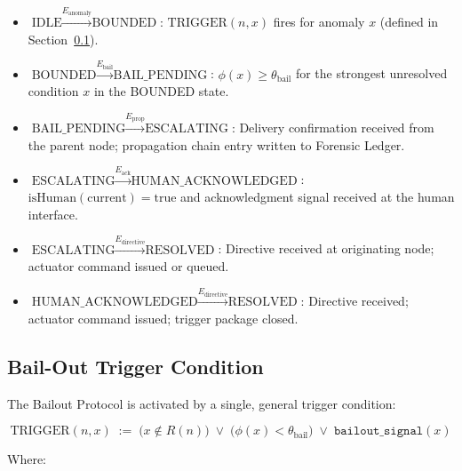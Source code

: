 \begin{itemize}\itemsep=0pt
\item $\text{IDLE} \xrightarrow{E_{\text{anomaly}}} \text{BOUNDED}$:
  $\text{TRIGGER}(n, x)$ fires for anomaly $x$ (defined in
  Section~\ref{sec:bailout-trigger}).

\item $\text{BOUNDED} \xrightarrow{E_{\text{bail}}} \text{BAIL\_PENDING}$:
  $\phi(x) \geq \theta_{\text{bail}}$ for the strongest unresolved condition
  $x$ in the BOUNDED state.

\item $\text{BAIL\_PENDING} \xrightarrow{E_{\text{prop}}} \text{ESCALATING}$:
  Delivery confirmation received from the parent node; propagation chain entry
  written to Forensic Ledger.

\item $\text{ESCALATING} \xrightarrow{E_{\text{ack}}} \text{HUMAN\_ACKNOWLEDGED}$:
  $\text{isHuman}(\text{current}) = \text{true}$ and acknowledgment signal
  received at the human interface.

\item $\text{ESCALATING} \xrightarrow{E_{\text{directive}}} \text{RESOLVED}$:
  Directive received at originating node; actuator command issued or queued.

\item $\text{HUMAN\_ACKNOWLEDGED} \xrightarrow{E_{\text{directive}}}
  \text{RESOLVED}$: Directive received; actuator command issued; trigger package
  closed.
\end{itemize}


\subsection{Bail-Out Trigger Condition}\label{sec:bailout-trigger}

The Bailout Protocol is activated by a single, general trigger condition:

\begin{equation}
\text{TRIGGER}(n, x) \;:=\; \bigl( x \notin R(n) \bigr) \;\lor\;
  \bigl( \phi(x) < \theta_{\text{bail}} \bigr) \;\lor\;
  \texttt{bailout\_signal}(x) \tag{TC}
\end{equation}

Where:

